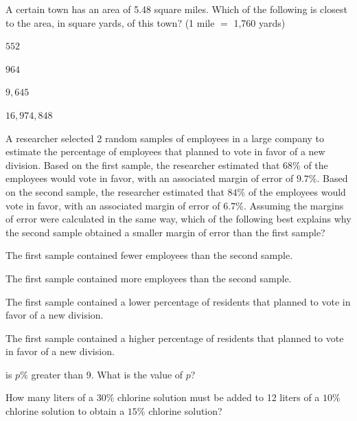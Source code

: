 \vfill
\noindent\begin{minipage}{\linewidth}
\par\smallskip
A certain town has an area of 5.48 square miles. Which of the following is closest to the area, in square yards, of this town? (1 mile $=$ 1,760 yards)
\begin{satchoices}
  \item[A)] $552$
  \item[B)] $964$
  \item[C)] $9{,}645$
  \item[D)] $16{,}974{,}848$
\end{satchoices}
\end{minipage}
\vfill
\noindent\begin{minipage}{\linewidth}
\par\smallskip
A researcher selected 2 random samples of employees in a large company to estimate the percentage of employees that planned to vote in favor of a new division. Based on the first sample, the researcher estimated that $68\%$ of the employees would vote in favor, with an associated margin of error of $9.7\%$. Based on the second sample, the researcher estimated that $84\%$ of the employees would vote in favor, with an associated margin of error of $6.7\%$. Assuming the margins of error were calculated in the same way, which of the following best explains why the second sample obtained a smaller margin of error than the first sample?
\begin{satchoices}
  \item[A)] The first sample contained fewer employees than the second sample.
  \item[B)] The first sample contained more employees than the second sample.
  \item[C)] The first sample contained a lower percentage of residents that planned to vote in favor of a new division.
  \item[D)] The first sample contained a higher percentage of residents that planned to vote in favor of a new division.
\end{satchoices}
\end{minipage}
\vfill
\clearpage
\noindent\begin{minipage}{\linewidth}
\par{} is $p\%$ greater than 9. What is the value of $p$?
\end{minipage}
\vfill
\noindent\begin{minipage}{\linewidth}
\par\smallskip
How many liters of a $30\%$ chlorine solution must be added to 12 liters of a $10\%$ chlorine solution to obtain a $15\%$ chlorine solution?
\end{minipage}
